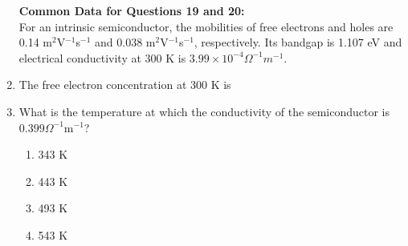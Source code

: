 \documentclass[journal]{IEEEtran}
\begin{document}
\begin{enumerate}
\textbf{Common Data for Questions 19 and 20:}\\
 For an intrinsic semiconductor, the mobilities of free electrons and holes are 0.14 m$^{2}$V$^{-1}$s$^{-1}$
 and 0.038 m$^{2}$V$^{-1}$s$^{-1}$, respectively. Its bandgap is 1.107 eV and electrical conductivity at 300 K is $3.99 \times 10^{-4} \Omega ^{-1}m^{-1}$.  \\
\item The free electron concentration  at 300 K is
\begin{enumerate}
\end{enumerate}
\item What is the temperature at which the conductivity of the semiconductor is $0.399 \Omega^{-1}\text{m}^{-1}$?
\begin{multicols}{4}
\begin{enumerate}
    \item 343 K
    \item 443 K
    \item 493 K
    \item 543 K
\end{enumerate}
\end{multicols}


\end{enumerate}
\end{document}
